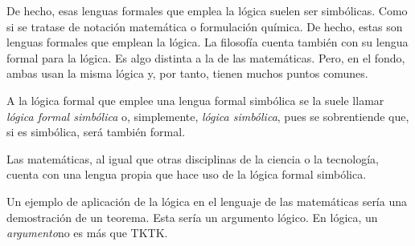 De hecho, esas lenguas formales que emplea la lógica suelen ser simbólicas.
Como si se tratase de notación matemática o formulación química. De hecho,
estas son lenguas formales que emplean la lógica. La filosofía cuenta
también con su lengua formal para la lógica. Es algo distinta a la de las
matemáticas. Pero, en el fondo, ambas usan la misma lógica y, por tanto,
tienen muchos puntos comunes.

A la lógica formal que emplee una lengua formal simbólica se la suele llamar
\emph{lógica formal simbólica} o, simplemente, \emph{lógica simbólica}, pues
se sobrentiende que, si es simbólica, será también formal.

Las matemáticas, al igual que otras disciplinas de la ciencia o la
tecnología, cuenta con una lengua propia que hace uso de la lógica formal
simbólica.

Un ejemplo de aplicación de la lógica en el lenguaje de las matemáticas
sería una demostración de un teorema. Esta sería un argumento lógico. En
lógica, un \emph{argumento}\footnotemark no es más que TKTK.





